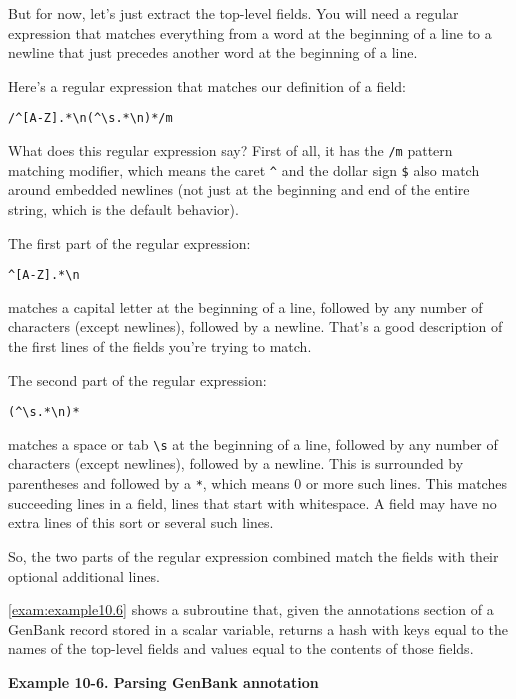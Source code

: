 But for now, let's just extract the top-level fields. You will need a regular expression that matches everything from a word at the beginning of a line to a newline that just precedes another word at the beginning of a line.

Here's a regular expression that matches our definition of a field:

\begin{lstlisting}
/^[A-Z].*\n(^\s.*\n)*/m
\end{lstlisting}

What does this regular expression say? First of all, it has the \verb|/m| pattern matching modifier, which means the caret \verb|^| and the dollar sign \verb|$| also match around embedded newlines (not just at the beginning and end of the entire string, which is the default behavior).

The first part of the regular expression:
  
\begin{lstlisting}
^[A-Z].*\n
\end{lstlisting}

matches a capital letter at the beginning of a line, followed by any number of characters (except newlines), followed by a newline. That's a good description of the first lines of the fields you're trying to match.

The second part of the regular expression:
  
\begin{lstlisting}
(^\s.*\n)*
\end{lstlisting}

matches a space or tab \verb|\s| at the beginning of a line, followed by any number of characters (except newlines), followed by a newline. This is surrounded by parentheses and followed by a \verb|*|, which means 0 or more such lines. This matches succeeding lines in a field, lines that start with whitespace. A field may have no extra lines of this sort or several such lines.

So, the two parts of the regular expression combined match the fields with their optional additional lines.

\autoref{exam:example10.6} shows a subroutine that, given the annotations section of a GenBank record stored in a scalar variable, returns a hash with keys equal to the names of the top-level fields and values equal to the contents of those fields.

\textbf{Example 10-6. Parsing GenBank annotation}


